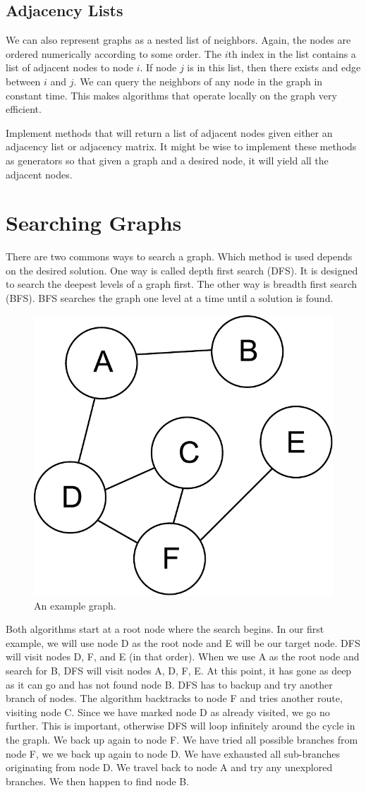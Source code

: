 \subsection*{Adjacency Lists}
We can also represent graphs as a nested list of neighbors.
Again, the nodes are ordered numerically according to some order.
The $i$th index in the list contains a list of adjacent nodes to node $i$.  
If node $j$ is in this list, then there exists and edge between $i$ and $j$.
We can query the neighbors of any node in the graph in constant time.
This makes algorithms that operate locally on the graph very efficient. 

\begin{problem}
Implement methods that will return a list of adjacent nodes given either an adjacency list or adjacency matrix.
It might be wise to implement these methods as generators so that given a graph and a desired node, it will yield all the adjacent nodes.
\end{problem}

\section*{Searching Graphs}
There are two commons ways to search a graph.
Which method is used depends on the desired solution.
One way is called depth first search (DFS).  It is designed to search the deepest levels of a graph first.
The other way is breadth first search (BFS).  BFS searches the graph one level at a time until a solution is found.
\begin{figure}[h]
\centering
\includegraphics[width=.5\textwidth]{graph.pdf}
\caption{An example graph.}
\label{fig:bfs_dfs_graph}
\end{figure}

Both algorithms start at a root node where the search begins.
In our first example, we will use node D as the root node and E will be our target node.
DFS will visit nodes D, F, and E (in that order).
When we use A as the root node and search for B, DFS will visit nodes A, D, F, E.
At this point, it has gone as deep as it can go and has not found node B.
DFS has to backup and try another branch of nodes.
The algorithm backtracks to node F and tries another route, visiting node C.
Since we have marked node D as already visited, we go no further.
This is important, otherwise DFS will loop infinitely around the cycle in the graph.
We back up again to node F.  We have tried all possible branches from node F, we we back up again to node D.
We have exhausted all sub-branches originating from node D.
We travel back to node A and try any unexplored branches.
We then happen to find node B.

